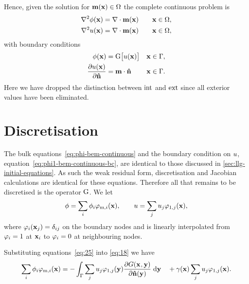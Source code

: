 Hence, given the solution for $\mathbf{m}(\mathbf{x}) \in \Omega$ the complete continuous problem is
 \begin{subequations}
   \label{eq:phi-bem-continuous}
   \begin{align}
     \label{eq:phim-bem-continuous}
     \nabla^2 \phi(\mathbf{x}) &= \nabla \cdot \mathbf{m}(\mathbf{x}) \quad & \mathbf{x} \in \Omega, \\
     \label{eq:phi1-bem-continuous}
     \nabla^2 u(\mathbf{x}) &= \nabla \cdot \mathbf{m}(\mathbf{x})    & \mathbf{x} \in \Omega,
   \end{align}
 \end{subequations}
with boundary conditions
 \begin{subequations}
   \label{eq:phi-bem-continuous-bc}
   \begin{align}
     \label{eq:phim-bem-continuous-bc}
     \phi(\mathbf{x}) &= {\mathbf{\mathrm{G}}} \big[ u(\mathbf{x}) \big]      & \mathbf{x} \in {\Gamma}, \\
     \label{eq:phi1-bem-continuous-bc}
       \frac{\partial u(\mathbf{x})}{\partial \mathbf{\hat{n}}} &= \mathbf{m} \cdot \mathbf{\hat{n}}  & \mathbf{x} \in {\Gamma}.
   \end{align}
 \end{subequations}
Here we have dropped the distinction between $\text{int}$ and $\text{ext}$ since all exterior values have been eliminated.


\section{Discretisation}
\label{sec:discretisation}

The bulk equations~\eqref{eq:phi-bem-continuous} and the boundary condition on $u$, equation~\eqref{eq:phi1-bem-continuous-bc}, are identical to those discussed in \autoref{sec:llg-initial-equations}.
As such the weak residual form, discretisation and Jacobian calculations are identical for these equations.
Therefore all that remains to be discretised is the operator ${\mathbf{\mathrm{G}}}$. We let
\begin{equation}
  \phi = \sum_{i} \phi_{{i}} \varphi_{\text{m},{i}}(\mathbf{x}),
  \qquad
  u = \sum_{j} u_{{j}} \varphi_{1,{j}}(\mathbf{x}),
  \label{eq:25}
\end{equation}
where $\varphi_{i}(\mathbf{x}_{j}) = \delta_{{i} {j}}$ on the boundary nodes and is linearly interpolated from $\varphi_{i} = 1$ at $\mathbf{x}_{i}$ to $\varphi_{i} = 0$ at neighbouring nodes.

Substituting equations~\eqref{eq:25} into \eqref{eq:18} we have
\begin{equation*}
  \sum_{i} \phi_{{i}} \varphi_{\text{m},{i}}(\mathbf{x}) =
  - \int_{{\Gamma}} \sum_{j} u_{{j}} \varphi_{1,{j}}(\mathbf{y})
  \frac{\partial G(\mathbf{x}_{},\mathbf{y})}{\partial \mathbf{\hat{n}}(\mathbf{y})} {\; \text{d}} \mathbf{y}
  \quad + \gamma(\mathbf{x}) \sum_{j} u_{{j}} \varphi_{1,{j}}(\mathbf{x}).
\end{equation*}

